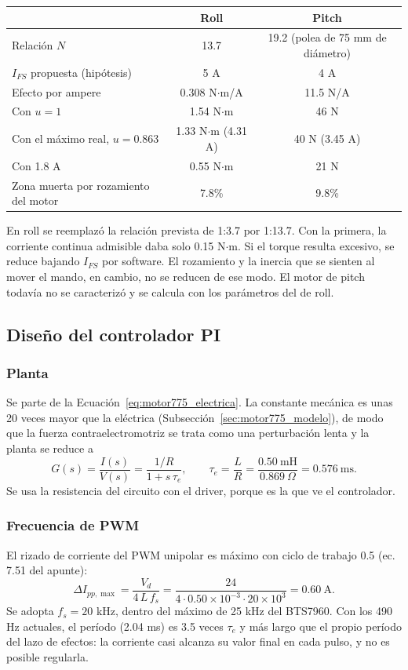 \begin{center}
\begin{tabular}{lcc}\toprule
 & Roll & Pitch\\\midrule
Relación $N$ & 13.7 & 19.2 (polea de 75 mm de diámetro)\\
$I_{FS}$ propuesta (hipótesis) & 5 A & 4 A\\
Efecto por ampere & 0.308 N$\cdot$m/A & 11.5 N/A\\
Con $u = 1$ & 1.54 N$\cdot$m & 46 N\\
Con el máximo real, $u = 0.863$ & 1.33 N$\cdot$m (4.31 A) & 40 N (3.45 A)\\
Con 1.8 A & 0.55 N$\cdot$m & 21 N\\
Zona muerta por rozamiento del motor & 7.8\% & 9.8\%\\\bottomrule
\end{tabular}
\end{center}
En roll se reemplazó la relación prevista de 1:3.7 por 1:13.7. Con la primera, la corriente continua admisible daba solo 0.15 N$\cdot$m. Si el torque resulta excesivo, se reduce bajando $I_{FS}$ por software. El rozamiento y la inercia que se sienten al mover el mando, en cambio, no se reducen de ese modo. El motor de pitch todavía no se caracterizó y se calcula con los parámetros del de roll.

\subsection{Diseño del controlador PI}
\label{sec:cc_pi}
\subsubsection{Planta}
Se parte de la Ecuación~\eqref{eq:motor775_electrica}. La constante mecánica es unas 20 veces mayor que la eléctrica (Subsección~\ref{sec:motor775_modelo}), de modo que la fuerza contraelectromotriz se trata como una perturbación lenta y la planta se reduce a
\begin{equation}
G(s) = \frac{I(s)}{V(s)} = \frac{1/R}{1 + s\,\tau_e},\qquad \tau_e = \frac{L}{R} = \frac{0.50\ \text{mH}}{0.869\ \Omega} = 0.576\ \text{ms}.
\label{eq:cc_planta}
\end{equation}
Se usa la resistencia del circuito con el driver, porque es la que ve el controlador.

\subsubsection{Frecuencia de PWM}
El rizado de corriente del PWM unipolar es máximo con ciclo de trabajo 0.5 (ec. 7.51 del apunte):
\begin{equation}
\Delta I_{pp,\max} = \frac{V_d}{4\,L\,f_s} = \frac{24}{4\cdot 0.50\times10^{-3}\cdot 20\times10^{3}} = 0.60\ \text{A}.
\label{eq:cc_rizado}
\end{equation}
Se adopta $f_s = 20$ kHz, dentro del máximo de 25 kHz del BTS7960. Con los 490 Hz actuales, el período (2.04 ms) es 3.5 veces $\tau_e$ y más largo que el propio período del lazo de efectos: la corriente casi alcanza su valor final en cada pulso, y no es posible regularla.

